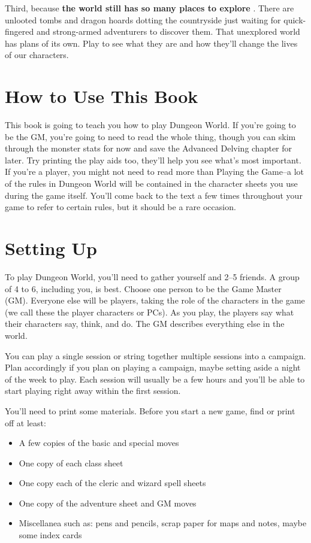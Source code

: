  Third, because \textbf{the world still has so many places to explore}
. There are unlooted tombs and dragon hoards dotting the countryside just waiting for quick-fingered and strong-armed adventurers to discover them. That unexplored world has plans of its own. Play to see what they are and how they'll change the lives of our characters.
\section*{How to Use This Book}


 This book is going to teach you how to play Dungeon World. If you're going to be the GM, you're going to need to read the whole thing, though you can skim through the monster stats for now and save the Advanced Delving chapter for later. Try printing the play aids too, they'll help you see what's most important. If you're a player, you might not need to read more than Playing the Game--a lot of the rules in Dungeon World will be contained in the character sheets you use during the game itself. You'll come back to the text a few times throughout your game to refer to certain rules, but it should be a rare occasion.
\section*{Setting Up}


 To play Dungeon World, you'll need to gather yourself and 2--5 friends. A group of 4 to 6, including you, is best. Choose one person to be the Game Master (GM). Everyone else will be players, taking the role of the characters in the game (we call these the player characters or PCs). As you play, the players say what their characters say, think, and do. The GM describes everything else in the world.


 You can play a single session or string together multiple sessions into a campaign. Plan accordingly if you plan on playing a campaign, maybe setting aside a night of the week to play. Each session will usually be a few hours and you'll be able to start playing right away within the first session.


 You'll need to print some materials. Before you start a new game, find or print off at least:
\begin{itemize}
\item A few copies of the basic and special moves
\item One copy of each class sheet
\item One copy each of the cleric and wizard spell sheets
\item One copy of the adventure sheet and GM moves
\item Miscellanea such as: pens and pencils, scrap paper for maps and notes, maybe some index cards

\end{itemize}


